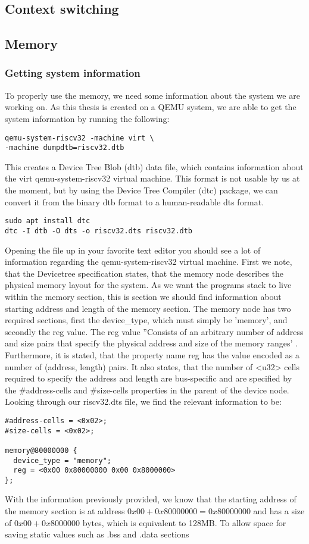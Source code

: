 \subsection{Context switching}



\subsection{Memory}
\subsubsection{Getting system information}\label{sec:sys-info}
To properly use the memory, we need some information about the system we are
working on. As this thesis is created on a QEMU system, we are able to get the
system information by running the following:
\begin{lstlisting}
qemu-system-riscv32 -machine virt \
-machine dumpdtb=riscv32.dtb
\end{lstlisting}
 This creates a Device Tree Blob (dtb) data file, which contains information
 about the virt qemu-system-riscv32 virtual machine. This format is not usable
 by us at the moment, but by using the Device Tree Compiler (dtc) package, we
 can convert it from the binary dtb format to a human-readable dts format.
\begin{lstlisting}
sudo apt install dtc
dtc -I dtb -O dts -o riscv32.dts riscv32.dtb
\end{lstlisting}
Opening the file up in your favorite text editor you should see a lot of
information regarding the qemu-system-riscv32 virtual machine. First we note,
that the Devicetree specification states, that the memory node describes the
physical memory layout for the system. As we want the programs stack to live
within the memory section, this is section we should find information about
starting address and length of the memory section. The memory node has two
required sections, first the device\_type, which must simply be 'memory', and
secondly the reg value. The reg value ''Consists of an arbitrary number of
address and size pairs that specify the physical address and size of the memory
ranges' \cite{DTS}. Furthermore, it is stated, that the property name reg has
the value encoded as a number of (address, length) pairs. It also states, that
the number of <u32> cells required to specify the address and length are
bus-specific and are specified by the \#address-cells and \#size-cells
properties in the parent of the device node. Looking through our riscv32.dts
file, we find the relevant information to be:
\begin{lstlisting}
#address-cells = <0x02>;
#size-cells = <0x02>;

memory@80000000 {
  device_type = "memory";
  reg = <0x00 0x80000000 0x00 0x8000000>
};
\end{lstlisting}
With the information previously provided, we know that the starting address of
the memory section is at address $0x00 + 0x80000000 = 0x80000000$ and has a size
of $0x00 + 0x8000000$ bytes, which is equivalent to 128MB. To allow space for
saving static values such as .bss and .data sections

